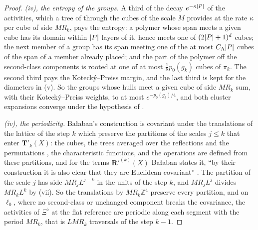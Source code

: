 \documentclass[11pt]{preprint}
\DeclarePairedDelimiter{\abs}{\lvert}{\rvert}
\numberwithin{equation}{section}
\theoremstyle{definition}
\theoremstyle{remark}
\theoremstyle{plain}
\begin{document}
\begin{proof}
\emph{(iv), the entropy of the groups.} A third of the decay $e^{-\kappa\abs P}$ of the activities, which a tree of \cite[(1.67)]{BalabanLFR2} through the cubes of the scale $M$ provides at the rate $\kappa$ per cube of side $MR_k$, pays the entropy: a polymer whose span meets a given cube has its domain within $\abs P$ layers of it, hence meets one of $(2\abs P + 1)^d$ cubes; the next member of a group has its span meeting one of the at most $C_\Lambda\abs P$ cubes of the span of a member already placed; and the part of the polymer off the second-class components is rooted at one of at most $\frac18p_0(g_k)$ cubes of $\pi_k$. The second third pays the Koteck\'y--Preiss margin, and the last third is kept for the diameters in (v). So the groups whose hulls meet a given cube of side $MR_k$ sum, with their Koteck\'y--Preiss weights, to at most $e^{-p_0(g_k)/4}$, and both cluster expansions converge under the hypothesis of \cite[p.~389]{BalabanLFR2}.

\emph{(iv), the periodicity.} Ba{\l}aban's construction is covariant under the translations of the lattice of the step $k$ which preserve the partitions of the scales $j \leq k$ that enter $\mathbf T'_k(X)$: the cubes, the trees averaged over the reflections and the permutations \cite[p.~201]{BalabanLFR1}, the characteristic functions, and the operations are defined from these partitions, and for the terms $\mathbf R'^{(k)}(X)$ Ba{\l}aban states it, ``by their construction it is also clear that they are Euclidean covariant'' \cite[p.~390]{BalabanLFR2}. The partition of the scale $j$ has side $MR_jL^{j-k}$ in the units of the step $k$, and $MR_jL^j$ divides $MR_kL^k$ by (vii). So the translations by $MR_k\mathbb Z^4$ preserve every partition, and on $\ell_0$, where no second-class or unchanged component breaks the covariance, the activities of $\Xi^\flat$ at the flat reference are periodic along each segment with the period $MR_k$, that is $LMR_k$ traversals of the step $k - 1$.


\end{proof}
\end{document}

